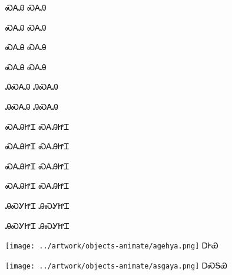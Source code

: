 \documentclass[avery5371]{flashcards}%
\begin{document}
\begin{flashcard}{\Huge ᏍᎪᎯ}
\Huge ᏍᎪᎯ
\end{flashcard}

\begin{flashcard}{\Huge ᏍᎪᎯ}
\Huge ᏍᎪᎯ
\end{flashcard}

\begin{flashcard}{\Huge ᏍᎪᎯ}
\Huge ᏍᎪᎯ
\end{flashcard}

\begin{flashcard}{\Huge ᏍᎪᎯ}
\Huge ᏍᎪᎯ
\end{flashcard}

\begin{flashcard}{\Huge ᎯᏍᎪᎯ}
\Huge ᎯᏍᎪᎯ
\end{flashcard}

\begin{flashcard}{\Huge ᎯᏍᎪᎯ}
\Huge ᎯᏍᎪᎯ
\end{flashcard}

\begin{flashcard}{\Huge ᏍᎪᎯᏥᏆ}
\Huge ᏍᎪᎯᏥᏆ
\end{flashcard}

\begin{flashcard}{\Huge ᏍᎪᎯᏥᏆ}
\Huge ᏍᎪᎯᏥᏆ
\end{flashcard}

\begin{flashcard}{\Huge ᏍᎪᎯᏥᏆ}
\Huge ᏍᎪᎯᏥᏆ
\end{flashcard}

\begin{flashcard}{\Huge ᏍᎪᎯᏥᏆ}
\Huge ᏍᎪᎯᏥᏆ
\end{flashcard}

\begin{flashcard}{\Huge ᎯᏍᎩᏥᏆ}
\Huge ᎯᏍᎩᏥᏆ
\end{flashcard}

\begin{flashcard}{\Huge ᎯᏍᎩᏥᏆ}
\Huge ᎯᏍᎩᏥᏆ
\end{flashcard}


\begin{flashcard}{
\texttt{[image: ../artwork/objects-animate/agehya.png]}
}
\Huge ᎠᎨᏯ
\end{flashcard}

\begin{flashcard}{
\texttt{[image: ../artwork/objects-animate/asgaya.png]}
}
\Huge ᎠᏍᎦᏯ
\end{flashcard}
\end{document}
